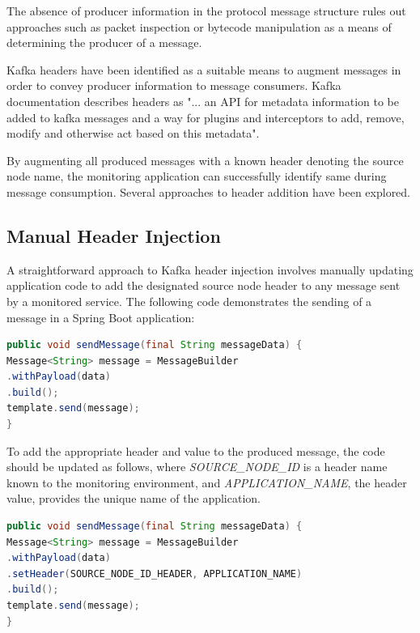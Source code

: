 The absence of producer information in the protocol message structure rules out approaches such as packet inspection or bytecode manipulation as a means of determining the producer of a message. 

Kafka headers have been identified as a suitable means to augment messages in order to convey producer information to message consumers. Kafka documentation describes headers as "... an API for metadata information to be added to kafka messages and a way for plugins and interceptors to add, remove, modify and otherwise act based on this metadata"\cite{KafkaHeaders}.

By augmenting all produced messages with a known header denoting the source node name, the monitoring application can successfully identify same during message consumption. Several approaches to header addition have been explored.

\subsection{Manual Header Injection} \label{manual_header_addition}

A straightforward approach to Kafka header injection involves manually updating application code to add the designated source node header to any message sent by a monitored service. The following code demonstrates the sending of a message in a Spring Boot application:

\vspace{5mm}

\begin{lstlisting}[language = Java, caption={Sending a message with Spring Kafka},captionpos=b]
public void sendMessage(final String messageData) {
Message<String> message = MessageBuilder
.withPayload(data)
.build();
template.send(message);
}
\end{lstlisting}

To add the appropriate header and value to the produced message, the code should be updated as follows, where \textit{SOURCE\_NODE\_ID} is a header name known to the monitoring environment, and \textit{APPLICATION\_NAME}, the header value, provides the unique name of the application.

\vspace{5mm}

\begin{lstlisting}[language = Java, caption={Sending a message with Spring Kafka},captionpos=b]
public void sendMessage(final String messageData) {
Message<String> message = MessageBuilder
.withPayload(data)
.setHeader(SOURCE_NODE_ID_HEADER, APPLICATION_NAME)
.build();
template.send(message);
}
\end{lstlisting}


